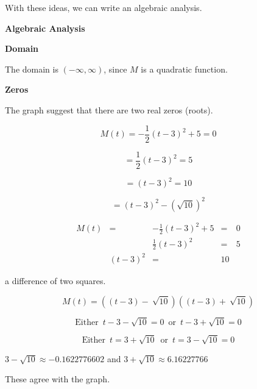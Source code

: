 \documentclass{ximera}
\begin{document}
\begin{example}
With these ideas, we can write an algebraic analysis. 



\textbf{\textcolor{red!75!green}{Algebraic Analysis}} 






\textbf{Domain}

The domain is $(-\infty, \infty)$, since $M$ is a quadratic function.  








\textbf{Zeros}

The graph suggest that there are two real zeros (roots). 


\[
M(t) = -\frac{1}{2} (t-3)^2 + 5 =0
\]


\[
  = \frac{1}{2} (t-3)^2 = 5
\]



\[
  =  (t-3)^2  = 10
\]





\[
  =  (t-3)^2  - \left( \sqrt{10} \right)^2 
\]





\begin{align*}
M(t) & = & -\frac{1}{2} (t-3)^2 + 5 & = & 0 \\
&   & \frac{1}{2} (t-3)^2 & = & 5  \\
&   (t-3)^2  & = & 10
\end{align*}




a difference of two squares. 




\[
M(t) =  ((t-3)  - \ \sqrt{10})  ((t-3)  + \ \sqrt{10}) 
\]






\[
\text{Either } \, t - 3 - \sqrt{10} = 0 \, \text{ or } \, t - 3 + \sqrt{10} = 0 
\]







\[
\text{Either } \, t = 3 + \sqrt{10}  \, \text{ or } \, t = 3 - \sqrt{10} = 0 
\]




$3 - \sqrt{10} \approx -0.1622776602$ and $3 + \sqrt{10} \approx 6.16227766$ 


These agree with the graph. 






\end{example}
\end{document}

